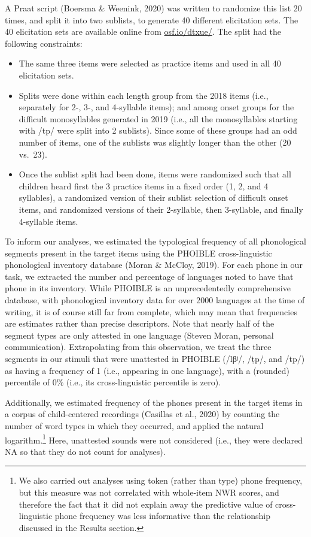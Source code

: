 \documentclass[english,,man,floatsintext]{apa6}
\providecommand{\tightlist}{%
  \setlength{\itemsep}{0pt}\setlength{\parskip}{0pt}}
\begin{document}
A Praat script (Boersma \& Weenink, 2020) was written to randomize this list 20 times, and split it into two sublists, to generate 40 different elicitation sets. The 40 elicitation sets are available online from \href{https://osf.io/dtxue/}{osf.io/dtxue/}. The split had the following constraints:

\begin{itemize}
\tightlist
\item
  The same three items were selected as practice items and used in all 40 elicitation sets.
\item
  Splits were done within each length group from the 2018 items (i.e., separately for 2-, 3-, and 4-syllable items); and among onset groups for the difficult monosyllables generated in 2019 (i.e., all the monosyllables starting with /tp/ were split into 2 sublists). Since some of these groups had an odd number of items, one of the sublists was slightly longer than the other (20 vs.~23).
\item
  Once the sublist split had been done, items were randomized such that all children heard first the 3 practice items in a fixed order (1, 2, and 4 syllables), a randomized version of their sublist selection of difficult onset items, and randomized versions of their 2-syllable, then 3-syllable, and finally 4-syllable items.
\end{itemize}

To inform our analyses, we estimated the typological frequency of all phonological segments present in the target items using the PHOIBLE cross-linguistic phonological inventory database (Moran \& McCloy, 2019). For each phone in our task, we extracted the number and percentage of languages noted to have that phone in its inventory. While PHOIBLE is an unprecedentedly comprehensive database, with phonological inventory data for over 2000 languages at the time of writing, it is of course still far from complete, which may mean that frequencies are estimates rather than precise descriptors. Note that nearly half of the segment types are only attested in one language (Steven Moran, personal communication). Extrapolating from this observation, we treat the three segments in our stimuli that were unattested in PHOIBLE (/lβʲ/, /ṭp/, and /tp/) as having a frequency of 1 (i.e., appearing in one language), with a (rounded) percentile of 0\% (i.e., its cross-linguistic percentile is zero).

Additionally, we estimated frequency of the phones present in the target items in a corpus of child-centered recordings (Casillas et al., 2020) by counting the number of word types in which they occurred, and applied the natural logarithm.\footnote{We also carried out analyses using token (rather than type) phone frequency, but this measure was not correlated with whole-item NWR scores, and therefore the fact that it did not explain away the predictive value of cross-linguistic phone frequency was less informative than the relationship discussed in the Results section.} Here, unattested sounds were not considered (i.e., they were declared NA so that they do not count for analyses).
\end{document}
